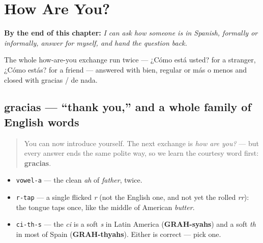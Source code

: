
\chapter{How Are You?}
\label{ch:how-are-you}

\begin{chapteropening}
\textbf{By the end of this chapter:} \emph{I can ask how someone is in Spanish, formally or informally, answer for myself, and hand the question back.}

The whole how-are-you exchange run twice — ¿Cómo está usted? for a stranger, ¿Cómo estás? for a friend — answered with bien, regular or más o menos and closed with gracias / de nada.
\end{chapteropening}

\section[gracias]{gracias — \textquotedblleft{}thank you,\textquotedblright{} and a whole family of English words}

\label{lesson:ES-C04-gracias}



\begin{quote}
You can now introduce yourself. The next exchange is \emph{how are you?} — but every answer ends the same polite way, so we learn the courtesy word first: \textbf{gracias}.
\end{quote}

\begin{sounds}
\begin{itemize}
\raggedright
  \item \texttt{vowel-a} — the clean \emph{ah} of \emph{father}, twice.
  \item \texttt{r-tap} — a single flicked \emph{r} (not the English one, and not yet the rolled \emph{rr}): the tongue taps once, like the middle of American \emph{butter}.
  \item \texttt{ci-th-s} — the \emph{ci} is a soft \emph{s} in Latin America (\textbf{GRAH-syahs}) and a soft \emph{th} in most of Spain (\textbf{GRAH-thyahs}). Either is correct — pick one.
\end{itemize}
\end{sounds}


